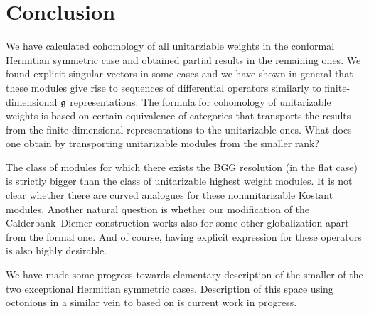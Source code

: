 \chapter*{Conclusion}

We have calculated cohomology of all unitarziable weights in the conformal Hermitian symmetric case and obtained partial results in the remaining ones. We found explicit singular vectors in some cases and we have shown in general that these modules give rise to sequences of differential operators similarly to finite-dimensional $\mathfrak{g}$ representations. The formula for cohomology of unitarizable weights is based on certain equivalence of categories that transports the results from the finite-dimensional representations to the unitarizable ones. What does one obtain by transporting unitarizable modules from the smaller rank? 

The class of modules for which there exists the BGG resolution (in the flat case) is strictly bigger than the class of unitarizable highest weight modules. It is not clear whether there are curved analogues for these nonunitarizable Kostant modules. Another natural question is whether our modification of the Calderbank--Diemer construction works also for some other globalization apart from the formal one. And of course, having explicit expression for these operators is also highly desirable. 

We have made some progress towards elementary description of the smaller of the two exceptional Hermitian symmetric cases. Description of this space using octonions in a similar vein to \cite{pazourek_hyperplane_2011} based on \cite{baez_division_2010} is current work in progress. 


